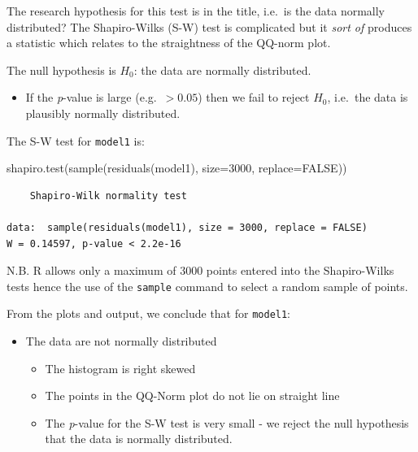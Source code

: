 \documentclass[
  oneside]{krantz}
\newenvironment{Shaded}{\begin{snugshade}}{\end{snugshade}}
\newcommand{\AttributeTok}[1]{\textcolor[rgb]{0.77,0.63,0.00}{#1}}
\newcommand{\ConstantTok}[1]{\textcolor[rgb]{0.00,0.00,0.00}{#1}}
\newcommand{\DecValTok}[1]{\textcolor[rgb]{0.00,0.00,0.81}{#1}}
\newcommand{\FunctionTok}[1]{\textcolor[rgb]{0.00,0.00,0.00}{#1}}
\newcommand{\NormalTok}[1]{#1}
\providecommand{\tightlist}{%
  \setlength{\itemsep}{0pt}\setlength{\parskip}{0pt}}
\begin{document}
The research hypothesis for this test is in the title, i.e.~is the data normally distributed? The Shapiro-Wilks (S-W) test is complicated but it \emph{sort of} produces a statistic which relates to the straightness of the QQ-norm plot.

The null hypothesis is \(H_0\): the data are normally distributed.

\begin{itemize}
\tightlist
\item
  If the \emph{p}-value is large (e.g.~\(>0.05\)) then we fail to reject \(H_0\), i.e.~the data is plausibly normally distributed.
\end{itemize}

The S-W test for \texttt{model1} is:

\begin{Shaded}
\begin{Highlighting}[]
\FunctionTok{shapiro.test}\NormalTok{(}\FunctionTok{sample}\NormalTok{(}\FunctionTok{residuals}\NormalTok{(model1), }\AttributeTok{size=}\DecValTok{3000}\NormalTok{, }\AttributeTok{replace=}\ConstantTok{FALSE}\NormalTok{))}
\end{Highlighting}
\end{Shaded}

\begin{verbatim}
    Shapiro-Wilk normality test

data:  sample(residuals(model1), size = 3000, replace = FALSE)
W = 0.14597, p-value < 2.2e-16
\end{verbatim}

N.B. R allows only a maximum of 3000 points entered into the Shapiro-Wilks tests hence the use of the \texttt{sample} command to select a random sample of points.

From the plots and output, we conclude that for \texttt{model1}:

\begin{itemize}
\item
  The data are not normally distributed

  \begin{itemize}
  \tightlist
  \item
    The histogram is right skewed
  \item
    The points in the QQ-Norm plot do not lie on straight line
  \item
    The \emph{p}-value for the S-W test is very small - we reject the null hypothesis that the data is normally distributed.
  \end{itemize}
\end{itemize}
\end{document}
